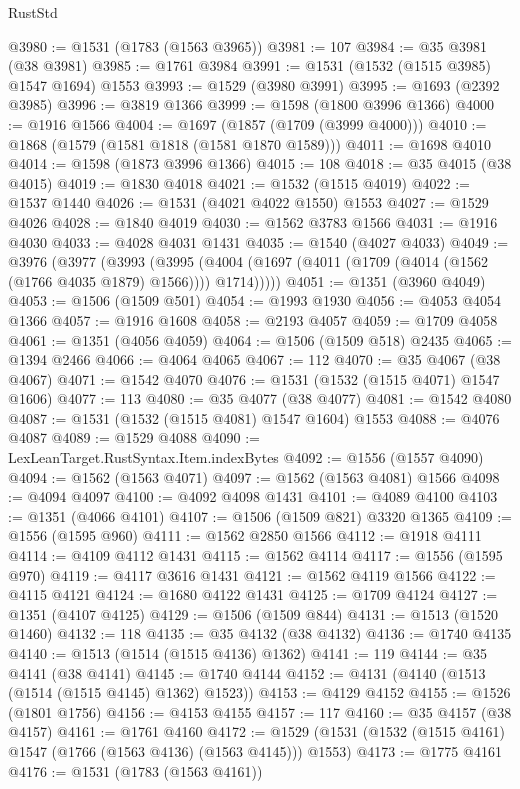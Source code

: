 \begin{lexlean}{RustStd}
\begin{coremodule}
{\begin{coremodule}
{{{{{{{{{{{{{{{{{{{{{{{{{{{{{{{{@3980 := @1531 (@1783 (@1563 @3965))
@3981 := 107
@3984 := @35 @3981 (@38 @3981)
@3985 := @1761 @3984
@3991 := @1531 (@1532 (@1515 @3985) @1547 @1694) @1553
@3993 := @1529 (@3980 @3991)
@3995 := @1693 (@2392 @3985)
@3996 := @3819 @1366
@3999 := @1598 (@1800 @3996 @1366)
@4000 := @1916 @1566
@4004 := @1697 (@1857 (@1709 (@3999 @4000)))
@4010 := @1868 (@1579 (@1581 @1818 (@1581 @1870 @1589)))
@4011 := @1698 @4010
@4014 := @1598 (@1873 @3996 @1366)
@4015 := 108
@4018 := @35 @4015 (@38 @4015)
@4019 := @1830 @4018
@4021 := @1532 (@1515 @4019)
@4022 := @1537 @1440
@4026 := @1531 (@4021 @4022 @1550) @1553
@4027 := @1529 @4026
@4028 := @1840 @4019
@4030 := @1562 @3783 @1566
@4031 := @1916 @4030
@4033 := @4028 @4031 @1431
@4035 := @1540 (@4027 @4033)
@4049 := @3976
    (@3977
      (@3993
        (@3995 (@4004 (@1697 (@4011 (@1709 (@4014 (@1562 (@1766 @4035 @1879) @1566)))) @1714)))))
@4051 := @1351 (@3960 @4049)
@4053 := @1506 (@1509 @501)
@4054 := @1993 @1930
@4056 := @4053 @4054 @1366
@4057 := @1916 @1608
@4058 := @2193 @4057
@4059 := @1709 @4058
@4061 := @1351 (@4056 @4059)
@4064 := @1506 (@1509 @518) @2435
@4065 := @1394 @2466
@4066 := @4064 @4065
@4067 := 112
@4070 := @35 @4067 (@38 @4067)
@4071 := @1542 @4070
@4076 := @1531 (@1532 (@1515 @4071) @1547 @1606)
@4077 := 113
@4080 := @35 @4077 (@38 @4077)
@4081 := @1542 @4080
@4087 := @1531 (@1532 (@1515 @4081) @1547 @1604) @1553
@4088 := @4076 @4087
@4089 := @1529 @4088
@4090 := LexLeanTarget.RustSyntax.Item.indexBytes
@4092 := @1556 (@1557 @4090)
@4094 := @1562 (@1563 @4071)
@4097 := @1562 (@1563 @4081) @1566
@4098 := @4094 @4097
@4100 := @4092 @4098 @1431
@4101 := @4089 @4100
@4103 := @1351 (@4066 @4101)
@4107 := @1506 (@1509 @821) @3320 @1365
@4109 := @1556 (@1595 @960)
@4111 := @1562 @2850 @1566
@4112 := @1918 @4111
@4114 := @4109 @4112 @1431
@4115 := @1562 @4114
@4117 := @1556 (@1595 @970)
@4119 := @4117 @3616 @1431
@4121 := @1562 @4119 @1566
@4122 := @4115 @4121
@4124 := @1680 @4122 @1431
@4125 := @1709 @4124
@4127 := @1351 (@4107 @4125)
@4129 := @1506 (@1509 @844)
@4131 := @1513 (@1520 @1460)
@4132 := 118
@4135 := @35 @4132 (@38 @4132)
@4136 := @1740 @4135
@4140 := @1513 (@1514 (@1515 @4136) @1362)
@4141 := 119
@4144 := @35 @4141 (@38 @4141)
@4145 := @1740 @4144
@4152 := @4131 (@4140 (@1513 (@1514 (@1515 @4145) @1362) @1523))
@4153 := @4129 @4152
@4155 := @1526 (@1801 @1756)
@4156 := @4153 @4155
@4157 := 117
@4160 := @35 @4157 (@38 @4157)
@4161 := @1761 @4160
@4172 := @1529 (@1531 (@1532 (@1515 @4161) @1547 (@1766 (@1563 @4136) (@1563 @4145))) @1553)
@4173 := @1775 @4161
@4176 := @1531 (@1783 (@1563 @4161))
}}}}}}}}}}}}}}}}}}}}}}}}}}}}}}}}
\end{coremodule}}
\end{coremodule}
\end{lexlean}
